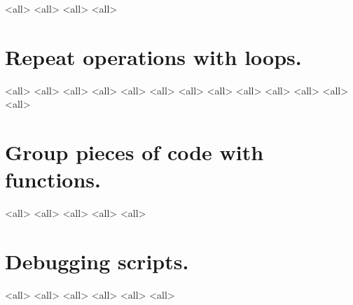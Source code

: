 \mode<all>{}
\mode<all>{}
\mode<all>{}
\mode<all>{}

\section{Repeat operations with loops.}
\mode<all>{}
\mode<all>{}
\mode<all>{}
\mode<all>{}
\mode<all>{}
\mode<all>{}
\mode<all>{}
\mode<all>{}
\mode<all>{}
\mode<all>{}
\mode<all>{}
\mode<all>{}
\mode<all>{}
%
\section{Group pieces of code with functions.}
\mode<all>{}
\mode<all>{}
\mode<all>{}
\mode<all>{}
\mode<all>{}

\section{Debugging scripts.}
\mode<all>{}
\mode<all>{}
\mode<all>{}
\mode<all>{}
\mode<all>{}
\mode<all>{}



